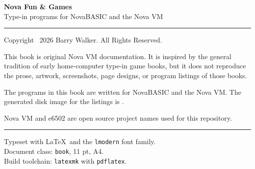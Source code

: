 \thispagestyle{empty}
\vspace*{\fill}
\begin{flushleft}

{\large\bfseries Nova Fun \& Games}\\[0.4em]
{\normalsize Type-in programs for NovaBASIC and the Nova VM}

\bigskip
\noindent\rule{\textwidth}{0.4pt}
\bigskip

{\small
Copyright \textcopyright\ 2026 Barry Walker. All Rights Reserved.

\medskip
This book is original Nova VM documentation. It is inspired by the general
tradition of early home-computer type-in game books, but it does not reproduce
the prose, artwork, screenshots, page designs, or program listings of those
books.

\medskip
The programs in this book are written for NovaBASIC and the Nova VM. The
generated disk image for the listings is \diskname.

\medskip
Nova VM and e6502 are open source project names used for this repository.
}

\bigskip
\noindent\rule{\textwidth}{0.4pt}

\vspace{2em}
{\footnotesize\color{softgray}
Typeset with \LaTeX\ and the \texttt{lmodern} font family.\\
Document class: \texttt{book}, 11 pt, A4.\\
Build toolchain: \texttt{latexmk} with \texttt{pdflatex}.
}

\end{flushleft}
\vspace*{\fill}
